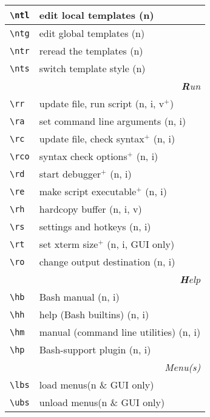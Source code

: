 \documentclass[oneside,12pt,a4paper,DIV18]{scrartcl}
\begin{document}
\begin{center}
\begin{tabular}[]{|p{11mm}|p{59mm}|}
%
\hline \verb'\ntl' & edit local templates      \hfill (n)\\
\hline \verb'\ntg' & edit global templates     \hfill (n)\\
\hline \verb'\ntr' & reread the templates      \hfill (n)\\
\hline \verb'\nts' & switch template style     \hfill (n)\\
\hline
\hline
\multicolumn{2}{|r|}{\textsl{\textbf{R}un}}\\
\hline \verb'\rr'  & update file, run script        \hfill (n, i, v$^+$)\\
\hline \verb'\ra'  & set command line arguments     \hfill (n, i)\\
\hline \verb'\rc'  & update file, check syntax$^+$  \hfill (n, i)\\
\hline \verb'\rco' & syntax check options$^+$       \hfill (n, i)\\
\hline \verb'\rd'  & start debugger$^+$             \hfill (n, i)\\
\hline \verb'\re'  & make script executable$^+$     \hfill (n, i)\\
\hline \verb'\rh'  & hardcopy buffer                \hfill (n, i, v)\\
\hline \verb'\rs'  & settings and hotkeys           \hfill (n, i)\\
\hline \verb'\rt'  & set xterm size$^+$             \hfill (n, i, GUI only)\\
\hline \verb'\ro'  & change output destination      \hfill (n, i)\\
\hline
\hline 
\multicolumn{2}{|r|}{\textsl{\textbf{H}elp}}\\
\hline \verb'\hb'  & Bash manual                     \hfill (n, i)\\
\hline \verb'\hh'  & help (Bash builtins)            \hfill (n, i)\\
\hline \verb'\hm'  & manual (command line utilities) \hfill (n, i)\\
\hline \verb'\hp'  & Bash-support plugin             \hfill (n, i)\\
\hline 
\hline
\multicolumn{2}{|r|}{\textsl{Menu(s)}}\\
\hline \verb'\lbs'  & load    menus\hfill \scriptsize{(n \& GUI only)}\\
\hline \verb'\ubs'  & unload  menus\hfill \scriptsize{(n \& GUI only)}\\
\hline 
\end{tabular}\\%

\end{center}
\end{document}
